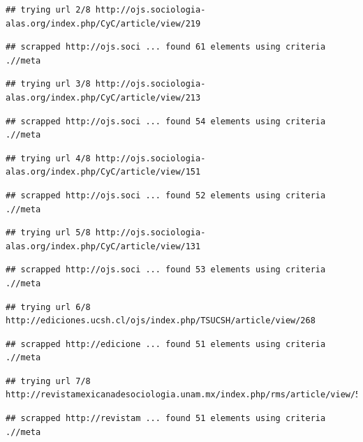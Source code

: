 \documentclass[
]{book}
\begin{document}
\begin{verbatim}
## trying url 2/8 http://ojs.sociologia-alas.org/index.php/CyC/article/view/219
\end{verbatim}

\begin{verbatim}
## scrapped http://ojs.soci ... found 61 elements using criteria .//meta
\end{verbatim}

\begin{verbatim}
## trying url 3/8 http://ojs.sociologia-alas.org/index.php/CyC/article/view/213
\end{verbatim}

\begin{verbatim}
## scrapped http://ojs.soci ... found 54 elements using criteria .//meta
\end{verbatim}

\begin{verbatim}
## trying url 4/8 http://ojs.sociologia-alas.org/index.php/CyC/article/view/151
\end{verbatim}

\begin{verbatim}
## scrapped http://ojs.soci ... found 52 elements using criteria .//meta
\end{verbatim}

\begin{verbatim}
## trying url 5/8 http://ojs.sociologia-alas.org/index.php/CyC/article/view/131
\end{verbatim}

\begin{verbatim}
## scrapped http://ojs.soci ... found 53 elements using criteria .//meta
\end{verbatim}

\begin{verbatim}
## trying url 6/8 http://ediciones.ucsh.cl/ojs/index.php/TSUCSH/article/view/268
\end{verbatim}

\begin{verbatim}
## scrapped http://edicione ... found 51 elements using criteria .//meta
\end{verbatim}

\begin{verbatim}
## trying url 7/8 http://revistamexicanadesociologia.unam.mx/index.php/rms/article/view/57723
\end{verbatim}

\begin{verbatim}
## scrapped http://revistam ... found 51 elements using criteria .//meta
\end{verbatim}
\end{document}
